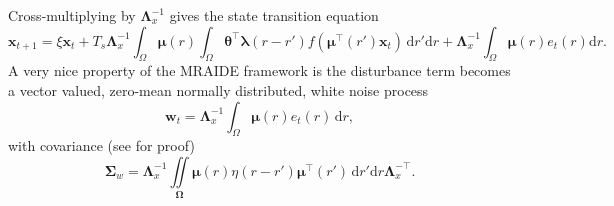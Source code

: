\documentclass[review,authoryear,3p]{elsarticle}
\begin{document}
Cross-multiplying by $\mathbf{\Lambda}_{x}^{-1}$ gives the state transition equation
\begin{equation}\label{eq:ApproxDiscreteTimeModel4}
	\mathbf{x}_{t+1} = 
	\xi \mathbf{x}_t + 
	T_s \mathbf{\Lambda}_{x}^{-1} \int_{\Omega}\boldsymbol\mu\left(r\right)\int_\Omega { 
	    \boldsymbol\theta^\top\boldsymbol\lambda\left(r-r'\right)
	    f\left(\boldsymbol\mu^\top\left(r'\right)\mathbf{x}_t\right) 
	\, \mathrm{d}r'\mathrm{d}r}  
	+ \mathbf{\Lambda}_{x}^{-1}\int_{\Omega}\boldsymbol{\mu}\left(r\right) e_t\left(r\right) \mathrm{d}r.
\end{equation}
A very nice property of the MRAIDE framework is the disturbance term becomes a vector valued, zero-mean normally distributed, white noise process 
\begin{equation}\label{eq:Disturbance}
\mathbf w_t= \mathbf{\Lambda}_{x}^{-1}\int_{\Omega}\boldsymbol\mu \left(r\right)e_t\left(r\right)\,\mathrm{d}r,
\end{equation}
with covariance (see \citet{Freestone2011} for proof)
\begin{equation}\label{eq:CovMatrix}
\boldsymbol\Sigma_w =\mathbf{\Lambda}_{x}^{-1}\iint\limits_{\boldsymbol\Omega}\boldsymbol\mu\left(r\right) \eta\left(r-r'\right)\boldsymbol\mu^{\top}\left(r'\right)\,\mathrm{d}r'\mathrm{d}r\mathbf{\Lambda}_{x}^{-\top}.
\end{equation} 
\end{document}
